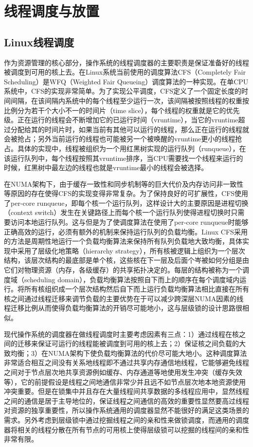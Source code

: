 \section{线程调度与放置}
\subsection{Linux线程调度}
作为资源管理的核心部分，操作系统的线程调度器的主要职责是保证准备好的线程被调度到可用的核上去。在Linux系统当前使用的调度算法CFS（Completely Fair Scheduling）\cite{lozi2016linux}是WFQ（Weighted Fair Queueing）调度算法的一种实现。在单CPU系统中，CFS的实现非常简单。为了实现公平调度，CFS定义了一个固定长度的时间间隔，在该间隔内系统中的每个线程至少运行一次，该间隔被按照线程的权重按比例分为若干个大小不一的时间片（time slice），每个线程的权重就是它的优先级。正在运行的线程会不断增加它的已运行时间（vruntime），当它的vruntime超过分配给其的时间片时，如果当前有其他可以运行的线程，那么正在运行的线程就会被抢占；另外当前运行的线程也可能被另一个被唤醒的vruntime更小的线程抢占。具体的实现中，线程被组织为一个用红黑树实现的运行队列（runqueue），在该运行队列中，每个线程按照其vruntime排序，当CPU需要找一个线程来运行的时候，红黑树中最左边的线程也就是vruntime最小的线程会被选择。

在NUMA架构下，由于缓存一致性和同步机制等的巨大代价及内存访问非一致性等原因的存在使得CFS的实现变得非常复杂。为了保持良好的可扩展性，CFS使用了per-core runqueue，即每个核一个运行队列，这样设计大的主要原因是进程切换（context switch）发生在关键路径上而每个核一个运行队列使得进程切换时只需要访问本地运行队列。这与但是为了使调度算法在使用了per-core runqueue时能够正确高效的运行，必须有额外的机制来保持运行队列的负载均衡。Linux CFS采用的方法是周期性地运行一个负载均衡算法来保持所有队列负载地大致均衡，具体实现中采用了层级化地策略（hierarchy strategy），所有核被逻辑上组织为一个层次结构，该层次结构的最底部是单个核，这些核在下一层及后面个岑被如何分组是由它们对物理资源（内存，各级缓存）的共享拓扑决定的。每层的结构被称为一个调度域（scheduling domain），负载均衡算法按照自下而上的顺序在每个调度域内运行。将所有核组织成一个层次结构然后自下而上运行负载均衡算法相比直接在所有核之间通过线程迁移来调节负载的主要优势在于可以减少跨深层NUMA因素的线程迁移比例从而使得负载均衡算法的开销尽可能地小，这与层级锁的设计思路很相似。

现代操作系统的调度器在做线程调度时主要考虑因素有三点：1）通过线程在核之间的迁移来保证可运行的线程能被调度到可用的核上去；2）保证核之间负载的大致均衡；3）在NUMA架构下使负载均衡算法的代价尽可能大地小。这种调度算法非常适合相互之间没有关系地线程即不通过共享内存通信地线程，它能够避免线程之间对于节点层次地共享资源例如缓存、内存通道等地使用发生冲突（缓存失效等），它的前提假设是线程之间地通信非常少并且远不如节点层次地本地资源使用冲突重要。但是在锁集中并且存在大量线程间共享数据的多线程应用中，显然线程之间的通信是居于主导地位的，保证线程之间通信的高效的重要性显然要高过线程对资源的独享重要性\cite{dice2015lock}，所以操作系统通用的调度器显然不能很好的满足这类场景的需求。另外考虑到层级锁中通过挖掘线程之间的亲和性来做锁调度，而通用的调度器将相关的线程分散在所有节点的可用核上使得层级锁可以挖掘的线程间的亲和性非常有限。

